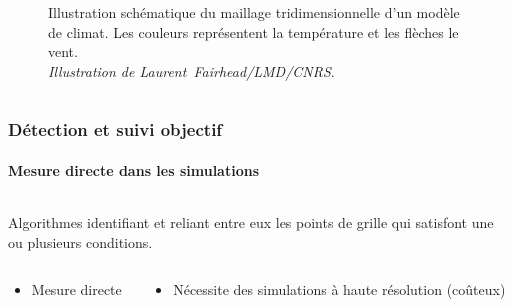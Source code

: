 \documentclass[aspectratio=169, usepdftitle=false, xcolor={dvipsnames}, 9pt,table]{beamer}
\begin{document}
\begin{frame}[c]
\begin{columns}
{\begin{column}{0.45\textwidth}
\begin{figure}[t]
                    \captionsetup{width=0.9\textwidth}
                    \caption{Illustration schématique du maillage tridimensionnelle d'un modèle de climat. Les couleurs représentent la température et les flèches
                    le vent.\\\textit{Illustration de \mbox{Laurent Fairhead/LMD/CNRS}}.}
                \end{figure}
            \end{column}
        }
    \end{columns} 
\end{frame}

\begin{frame}[c]
    \frametitle{Détection et suivi objectif}
    \framesubtitle{Mesure directe dans les simulations}
    \begin{columns}
        \begin{column}{0.66\textwidth}
            \footnotesize
            \begin{definition}
                \centering
                Algorithmes identifiant et reliant entre eux les points de grille qui satisfont une ou plusieurs conditions.
            \end{definition}
            \begin{columns}[t]
                \setlength{\leftmargini}{2.5ex}
                \begin{column}{0.45\textwidth}
                    \begin{examples}
                        \scriptsize
                        \begin{itemize}
                            \item Mesure directe
                        \end{itemize}
                        \tcblower
                    \end{examples}
                \end{column}
                \begin{column}{0.45\textwidth}
                    \begin{alertblock}[Inconvénients] 
                        \scriptsize
                        \begin{itemize}
                            \item Nécessite des simulations à haute résolution (coûteux)
                        \end{itemize}
                    \end{alertblock}

\end{column}
\end{columns}
\end{column}
\end{columns}
\end{frame}
\end{document}
